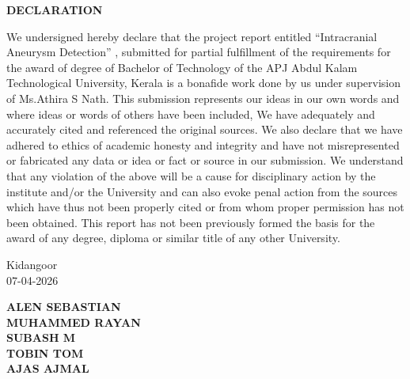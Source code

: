 \documentclass[twoside,a4paper,openright]{report} %
\begin{document}
\begin{center}
\textbf{DECLARATION}\\
\end{center}
We undersigned hereby declare that the project report entitled “Intracranial Aneurysm Detection”  , submitted for partial fulfillment of the requirements for the award of degree of Bachelor of Technology of the APJ Abdul Kalam Technological University, Kerala is a bonafide work done by us
under supervision of Ms.Athira S Nath. This submission represents our ideas in our own words and where ideas or words of others have been included, We have adequately and accurately cited and referenced the original sources. We also declare that we have
adhered to ethics of academic honesty and integrity and have not misrepresented or fabricated any data or idea or fact or source in our submission. We understand that any violation of the above will be a cause for disciplinary action by the institute and/or the
University and can also evoke penal action from the sources which have thus not been properly cited or from whom proper permission has not been obtained. This report has not been previously formed the basis for the award of any degree, diploma or similar title of any other University.

\noindent \begin{minipage}{0.45\linewidth}
\begin{flushleft}
\vspace{1 cm}
                         
Kidangoor \\
07-04-2026\\

\end{flushleft} 
\end{minipage}
\hfill
\begin{minipage}{0.45\linewidth}
\begin{flushright}                                      
\vspace{2cm}

\textbf{ALEN SEBASTIAN\\
MUHAMMED RAYAN\\
SUBASH M\\
TOBIN TOM\\
AJAS AJMAL
}



\end{flushright} 
\end{minipage}

\thispagestyle{empty}
\newpage
\mbox{~}
\newpage
\end{document}
